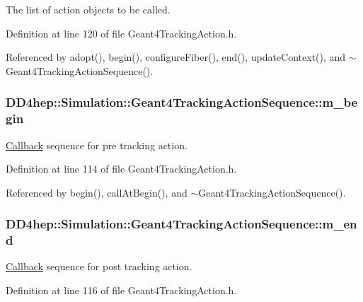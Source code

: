 The list of action objects to be called. 

Definition at line 120 of file Geant4TrackingAction.h.

Referenced by adopt(), begin(), configureFiber(), end(), updateContext(), and $\sim$Geant4TrackingActionSequence().\hypertarget{class_d_d4hep_1_1_simulation_1_1_geant4_tracking_action_sequence_a60424cd706472478d3c4e2f5d78f9540}{
\subsubsection[{m\_\-begin}]{ {\bf DD4hep::Simulation::Geant4TrackingActionSequence::m\_\-begin}}}
\label{class_d_d4hep_1_1_simulation_1_1_geant4_tracking_action_sequence_a60424cd706472478d3c4e2f5d78f9540}


\hyperlink{class_d_d4hep_1_1_callback}{Callback} sequence for pre tracking action. 

Definition at line 114 of file Geant4TrackingAction.h.

Referenced by begin(), callAtBegin(), and $\sim$Geant4TrackingActionSequence().\hypertarget{class_d_d4hep_1_1_simulation_1_1_geant4_tracking_action_sequence_ae7d724d09c2f2cd087d72bd448b41f79}{
\subsubsection[{m\_\-end}]{ {\bf DD4hep::Simulation::Geant4TrackingActionSequence::m\_\-end}}}
\label{class_d_d4hep_1_1_simulation_1_1_geant4_tracking_action_sequence_ae7d724d09c2f2cd087d72bd448b41f79}


\hyperlink{class_d_d4hep_1_1_callback}{Callback} sequence for post tracking action. 

Definition at line 116 of file Geant4TrackingAction.h.


